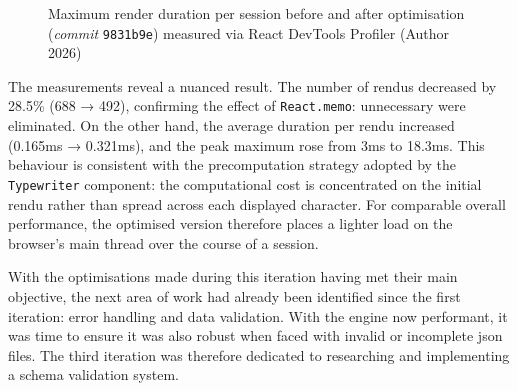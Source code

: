 \begin{figure}[H]
    \centering
    \caption{Maximum render duration per session before and after optimisation (\textit{commit} \texttt{9831b9e}) measured via React DevTools Profiler (Author 2026)}
    \label{fig:profiling_maxdur}
\end{figure}

\clearpage

The measurements reveal a nuanced result. The number of \glspl{rendu} decreased by 28.5\% (688 → 492), confirming the effect of \texttt{React.memo}: unnecessary  were eliminated. On the other hand, the average duration per \gls{rendu} increased (0.165ms → 0.321ms), and the peak maximum rose from 3ms to 18.3ms. This behaviour is consistent with the precomputation strategy adopted by the \texttt{Typewriter} component: the computational cost is concentrated on the initial \gls{rendu} rather than spread across each displayed character. For comparable overall performance, the optimised version therefore places a lighter load on the browser's main thread over the course of a session.



With the optimisations made during this iteration having met their main objective, the next area of work had already been identified since the first iteration: error handling and data validation. With the engine now performant, it was time to ensure it was also robust when faced with invalid or incomplete \gls{json} files. The third iteration was therefore dedicated to researching and implementing a \gls{schema} validation system.


